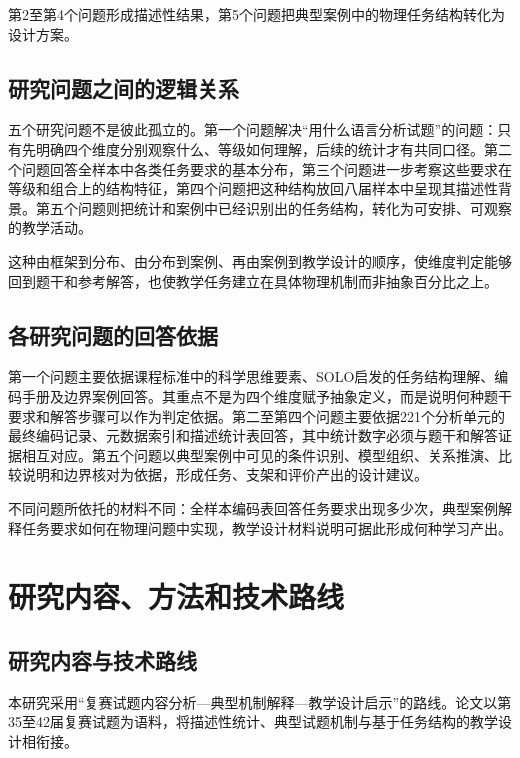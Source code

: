 \documentclass[
  12pt,
  a4paper,twoside,openany]{ctexbook}
\begin{document}
第2至第4个问题形成描述性结果，第5个问题把典型案例中的物理任务结构转化为设计方案。

\subsection{研究问题之间的逻辑关系}\label{ux7814ux7a76ux95eeux9898ux4e4bux95f4ux7684ux903bux8f91ux5173ux7cfb}

五个研究问题不是彼此孤立的。第一个问题解决``用什么语言分析试题''的问题：只有先明确四个维度分别观察什么、等级如何理解，后续的统计才有共同口径。第二个问题回答全样本中各类任务要求的基本分布，第三个问题进一步考察这些要求在等级和组合上的结构特征，第四个问题把这种结构放回八届样本中呈现其描述性背景。第五个问题则把统计和案例中已经识别出的任务结构，转化为可安排、可观察的教学活动。

这种由框架到分布、由分布到案例、再由案例到教学设计的顺序，使维度判定能够回到题干和参考解答，也使教学任务建立在具体物理机制而非抽象百分比之上。

\subsection{各研究问题的回答依据}\label{ux5404ux7814ux7a76ux95eeux9898ux7684ux56deux7b54ux4f9dux636e}

第一个问题主要依据课程标准中的科学思维要素、SOLO启发的任务结构理解、编码手册及边界案例回答。其重点不是为四个维度赋予抽象定义，而是说明何种题干要求和解答步骤可以作为判定依据。第二至第四个问题主要依据221个分析单元的最终编码记录、元数据索引和描述统计表回答，其中统计数字必须与题干和解答证据相互对应。第五个问题以典型案例中可见的条件识别、模型组织、关系推演、比较说明和边界核对为依据，形成任务、支架和评价产出的设计建议。

不同问题所依托的材料不同：全样本编码表回答任务要求出现多少次，典型案例解释任务要求如何在物理问题中实现，教学设计材料说明可据此形成何种学习产出。

\section{研究内容、方法和技术路线}\label{ux7814ux7a76ux5185ux5bb9ux65b9ux6cd5ux548cux6280ux672fux8defux7ebf}

\subsection{研究内容与技术路线}\label{ux7814ux7a76ux5185ux5bb9ux4e0eux6280ux672fux8defux7ebf}

本研究采用``复赛试题内容分析---典型机制解释---教学设计启示''的路线。论文以第35至42届复赛试题为语料，将描述性统计、典型试题机制与基于任务结构的教学设计相衔接。
\end{document}
